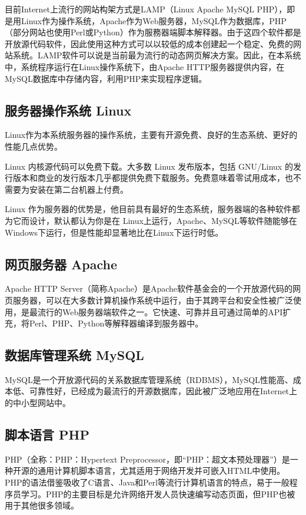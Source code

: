 目前Internet上流行的网站构架方式是LAMP（Linux Apache MySQL PHP），即是用Linux作为操作系统，Apache作为Web服务器，MySQL作为数据库，PHP（部分网站也使用Perl或Python）作为服務器端脚本解释器。由于这四个软件都是开放源代码软件，因此使用这种方式可以以较低的成本创建起一个稳定、免费的网站系统。LAMP软件可以说是当前最为流行的动态网页解决方案。因此，在本系统中，系统程序运行在Linux操作系统下，由Apache HTTP服务器提供内容，在MySQL数据库中存储内容，利用PHP来实现程序逻辑。

\subsection{服务器操作系统 Linux}

Linux作为本系统服务器的操作系统，主要有开源免费、良好的生态系统、更好的性能几点优势。

Linux 内核源代码可以免费下载。大多数 Linux 发布版本，包括 GNU/Linux 的发行版本和商业的发行版本几乎都提供免费下载服务。免费意味着零试用成本，也不需要为安装在第二台机器上付费。

Linux 作为服务器的优势是，他目前具有最好的生态系统，服务器端的各种软件都为它而设计，默认都认为你是在 Linux上运行，Apache、MySQL等软件随能够在Windows下运行，但是性能却显著地比在Linux下运行时低。

\subsection{网页服务器 Apache}
Apache HTTP Server（简称Apache）是Apache软件基金会的一个开放源代码的网页服务器，可以在大多数计算机操作系统中运行，由于其跨平台和安全性被广泛使用，是最流行的Web服务器端软件之一。它快速、可靠并且可通过简单的API扩充，将Perl、PHP、Python等解释器编译到服务器中。
\subsection{数据库管理系统 MySQL}
MySQL是一个开放源代码的关系数据库管理系统（RDBMS），MySQL性能高、成本低、可靠性好，已经成为最流行的开源数据库，因此被广泛地应用在Internet上的中小型网站中。
\subsection{脚本语言 PHP}
PHP（全称：PHP：Hypertext Preprocessor，即“PHP：超文本预处理器”）是一种开源的通用计算机脚本语言，尤其适用于网络开发并可嵌入HTML中使用。PHP的语法借鉴吸收了C语言、Java和Perl等流行计算机语言的特点，易于一般程序员学习。PHP的主要目标是允许网络开发人员快速编写动态页面，但PHP也被用于其他很多领域。
